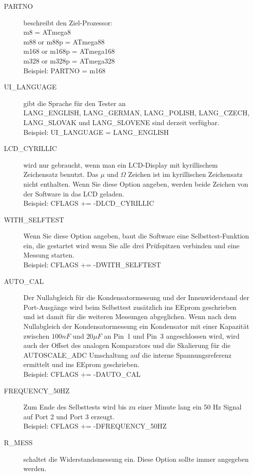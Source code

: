 \begin{description}
  \item[PARTNO] beschreibt den Ziel-Prozessor:\\
         m8 = ATmega8\\
         m88 or m88p = ATmega88\\
         m168 or m168p = ATmega168\\
         m328 or m328p = ATmega328\\
    Beispiel:  PARTNO = m168
  \item[UI\_LANGUAGE] gibt die Sprache f\"ur den Tester an\\
    LANG\_ENGLISH, LANG\_GERMAN, LANG\_POLISH, LANG\_CZECH,  LANG\_SLOVAK und  LANG\_SLOVENE sind derzeit verf\"ugbar.\\
    Beispiel: UI\_LANGUAGE = LANG\_ENGLISH
  \item[LCD\_CYRILLIC] wird nur gebraucht, wenn man ein LCD-Display mit kyrillischem Zeichensatz benutzt.
Das \(\mu\) und \(\Omega\) Zeichen ist im kyrillischen Zeichensatz nicht enthalten.
Wenn Sie diese Option angeben, werden beide Zeichen von der Software in das LCD geladen.\\
Beispiel: CFLAGS += -DLCD\_CYRILLIC
  \item[WITH\_SELFTEST] Wenn Sie diese Option angeben, baut die Software eine Selbsttest-Funktion ein, die gestartet wird
wenn Sie alle drei Pr\"ufspitzen verbinden und eine Messung starten.\\
Beispiel: CFLAGS += -DWITH\_SELFTEST
  \item[AUTO\_CAL] Der Nullabgleich f\"ur die Kondensatormessung und der Innenwiderstand der Port-Ausg\"ange wird beim
Selbsttest zus\"atzlich ins EEprom geschrieben und ist damit f\"ur die weiteren Messungen abgeglichen.
Wenn nach dem Nullabgleich der Kondensatormessung ein Kondensator mit einer Kapazit\"at zwischen \(100 nF\) und \(20 \mu F\) an Pin~1 und Pin~3 
angeschlossen wird, wird auch der Offset des analogen Komparators und die Skalierung f\"ur die AUTOSCALE\_ADC
Umschaltung auf die interne Spannungsreferenz ermittelt und ins EEprom geschrieben.\\
Beispiel: CFLAGS += -DAUTO\_CAL
  \item[FREQUENCY\_50HZ] Zum Ende des Selbsttests wird bis zu einer Minute lang ein 50 Hz Signal auf Port 2 und Port 3 erzeugt.\\
Beispiel: CFLAGS += -DFREQUENCY\_50HZ
  \item[R\_MESS] schaltet die Widerstandsmessung ein.
 Diese Option sollte immer angegeben werden.\\

\end{description}
